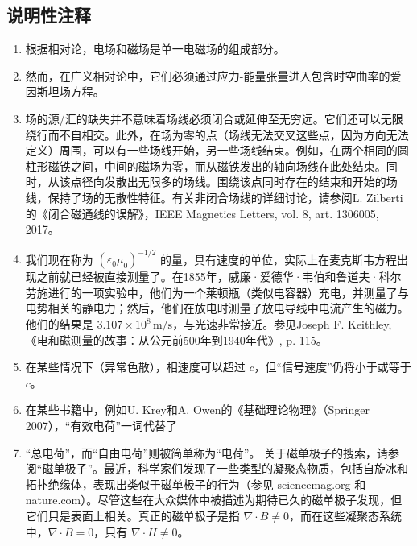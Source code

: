 \subsection{说明性注释}
\begin{enumerate}
\item 根据相对论，电场和磁场是单一电磁场的组成部分。
\item 然而，在广义相对论中，它们必须通过应力-能量张量进入包含时空曲率的爱因斯坦场方程。
\item 场的源/汇的缺失并不意味着场线必须闭合或延伸至无穷远。它们还可以无限绕行而不自相交。此外，在场为零的点（场线无法交叉这些点，因为方向无法定义）周围，可以有一些场线开始，另一些场线结束。例如，在两个相同的圆柱形磁铁之间，中间的磁场为零，而从磁铁发出的轴向场线在此处结束。同时，从该点径向发散出无限多的场线。围绕该点同时存在的结束和开始的场线，保持了场的无散性特征。有关非闭合场线的详细讨论，请参阅L. Zilberti的《闭合磁通线的误解》，IEEE Magnetics Letters, vol. 8, art. 1306005, 2017。
\item 我们现在称为 \((\varepsilon_0 \mu_0)^{-1/2}\) 的量，具有速度的单位，实际上在麦克斯韦方程出现之前就已经被直接测量了。在1855年，威廉·爱德华·韦伯和鲁道夫·科尔劳施进行的一项实验中，他们为一个莱顿瓶（类似电容器）充电，并测量了与电势相关的静电力；然后，他们在放电时测量了放电导线中电流产生的磁力。他们的结果是 \(3.107 \times 10^8 \, \text{m/s}\)，与光速非常接近。参见Joseph F. Keithley, 《电和磁测量的故事：从公元前500年到1940年代》, p. 115。
\item 在某些情况下（异常色散），相速度可以超过 \(c\)，但“信号速度”仍将小于或等于 \(c\)。
\item 在某些书籍中，例如U. Krey和A. Owen的《基础理论物理》（Springer 2007），“有效电荷”一词代替了\item “总电荷”，而“自由电荷”则被简单称为“电荷”。
关于磁单极子的搜索，请参阅“磁单极子”。最近，科学家们发现了一些类型的凝聚态物质，包括自旋冰和拓扑绝缘体，表现出类似于磁单极子的行为（参见 sciencemag.org 和 nature.com）。尽管这些在大众媒体中被描述为期待已久的磁单极子发现，但它们只是表面上相关。真正的磁单极子是指 \(\nabla \cdot B \neq 0\)，而在这些凝聚态系统中，\(\nabla \cdot B = 0\)，只有 \(\nabla \cdot H \neq 0\)。
\end{enumerate}

